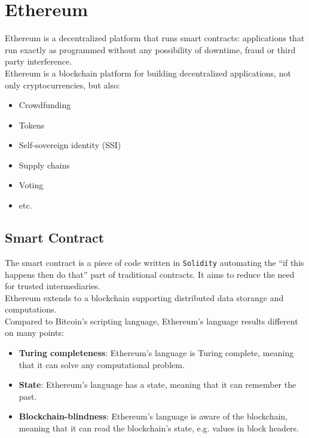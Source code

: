 \chapter{Ethereum}

Ethereum is a decentralized platform that runs smart contracts: applications that run exactly as programmed without any possibility of downtime, fraud or third party interference.\\
Ethereum is a blockchain platform for building decentralized applications, not only cryptocurrencies, but also:
\begin{itemize}
   \item Crowdfunding
   \item Tokens
   \item Self-sovereign identity (SSI)
   \item Supply chains
   \item Voting
   \item etc.
\end{itemize}

\section{Smart Contract}


The smart contract is a piece of code written in \texttt{Solidity} automating the ``if this happens then do that'' part of
traditional contracts. It aims to reduce the need for trusted intermediaries.\\
Ethereum extends to a blockchain supporting distributed data storange and computations.\\
Compared to Bitcoin's scripting language, Ethereum's language results different on many points:
\begin{itemize}
   \item \textbf{Turing completeness}: Ethereum's language is Turing complete, meaning that it can solve any computational problem.
   \item \textbf{State}: Ethereum's language has a state, meaning that it can remember the past.
   \item \textbf{Blockchain-blindness}: Ethereum's language is aware of the blockchain, meaning that it can read the blockchain's state, e.g. values in block headers.
\end{itemize} 

